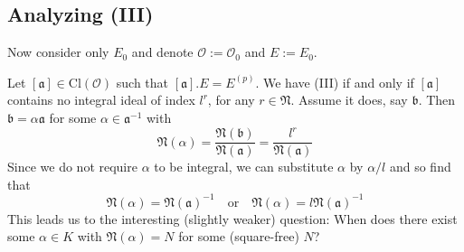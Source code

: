 \documentclass{scrartcl}
\newcommand{\N}{\mathbb{N}}
\newcommand{\Cl}{\mathrm{Cl}}
\renewcommand{\a}{\mathfrak{a}}
\renewcommand{\b}{\mathfrak{b}}
\renewcommand{\O}{\mathcal{O}}
\renewcommand{\N}{\mathfrak{N}}
\theoremstyle{definition}
\begin{document}
\subsection*{Analyzing (III)}
Now consider only $E_0$ and denote $\O := \O_0$ and $E := E_0$.

Let $[\a] \in \Cl(\O)$ such that $[\a].E = E^{(p)}$.
We have (III) if and only if $[\a]$ contains no integral ideal of index $l^r$, for any $r \in \N$.
Assume it does, say $\b$.
Then $\b = \alpha\a$ for some $\alpha \in \a^{-1}$ with
\begin{equation*}
    \N(\alpha) = \frac {\N(\b)} {\N(\a)} = \frac {l^r} {\N(\a)}
\end{equation*}
Since we do not require $\alpha$ to be integral, we can substitute $\alpha$ by $\alpha/l$ and so find that
\begin{equation*}
    \N(\alpha) = \N(\a)^{-1} \quad \text{or} \quad \N(\alpha) = l\N(\a)^{-1}
\end{equation*}
This leads us to the interesting (slightly weaker) question: When does there exist some $\alpha \in K$ with $\N(\alpha) = N$ for some (square-free) $N$?
\end{document}
